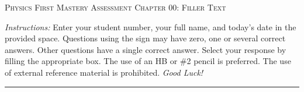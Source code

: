 \documentclass[
    11pt,
    fleqn,
]{scrartcl}
\newlength{\mylen}
\begin{document}

\begin{examcopy}[1]

\begin{minipage}{15.0em}
    \vspace{-1.00\baselineskip}
\end{minipage}
\setlength{\mylen}{\textwidth}
\addtolength{\mylen}{-15.0em}
\begin{minipage}{\mylen}
    \vspace{-1.00\baselineskip}
    \textsc{Physics First Mastery Assessment}
    \hfill
    \textsc{Chapter 00: Filler Text} \\
    \setlength{\fboxsep}{0.01\columnwidth}
    \setlength{\fboxrule}{0.8pt}
    \begin{minipage}{1.00\columnwidth}
        \small
        \vspace{0.50\baselineskip}
        \emph{Instructions:}
        Enter your student number, your full name,
            and today's date in the provided space.
        Questions using the sign \multiSymbole{} may have
            zero, one or several correct answers.
        Other questions have a single correct answer.
        Select your response by filling the appropriate box.
        The use of an HB or \#2 pencil is preferred.
        The use of external reference material is prohibited.
        \emph{Good Luck!}
    \end{minipage}
\end{minipage}
\begin{center}
    \hrule
\end{center}


\begin{multicols}{2}


\end{multicols}
\end{examcopy}
\end{document}
